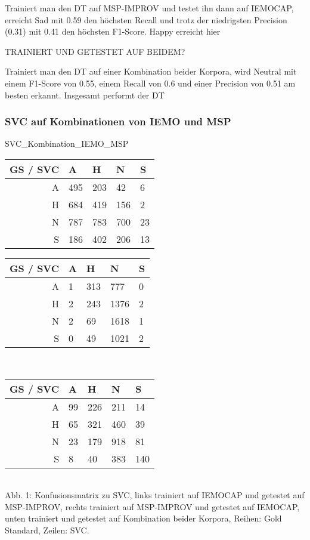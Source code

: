 \documentclass{article} %
\begin{document}
Trainiert man den DT auf MSP-IMPROV und testet ihn dann auf IEMOCAP, erreicht Sad mit 0.59 den höchsten Recall und trotz der niedrigsten Precision (0.31) mit 0.41 den höchsten F1-Score. 
Happy erreicht hier 

TRAINIERT UND GETESTET AUF BEIDEM?

Trainiert man den DT auf einer Kombination beider Korpora, wird Neutral mit einem F1-Score von 0.55, einem Recall von 0.6 und einer Precision von 0.51 am besten erkannt. Insgesamt performt der DT 

\subsubsection{SVC auf Kombinationen von IEMO und MSP}

SVC_Kombination_IEMO_MSP \\
\begin{tabular}{|r|llll|}
\hline
GS / SVC & A & H & N & S \\
\hline
A & 495 & 203 & 42 & 6 \\
H & 684 & 419 & 156 & 2 \\
N & 787 & 783 & 700 & 23 \\
S & 186 & 402 & 206 & 13 \\
\hline
\end{tabular}
\begin{tabular}{|r|llll|}
\hline
GS / SVC & A & H & N & S \\
\hline
A & 1 & 313 & 777 & 0 \\
H & 2 & 243 & 1376 & 2 \\
N & 2 & 69 & 1618 & 1 \\
S & 0 & 49 & 1021 & 2 \\
\hline
\end{tabular} \\
\begin{tabular}{|r|llll|}
\hline
GS / SVC & A & H & N & S \\
\hline
A & 99 & 226 & 211 & 14 \\
H & 65 & 321 & 460 & 39 \\
N & 23 & 179 & 918 & 81 \\
S & 8 & 40 & 383 & 140 \\
\hline
\end{tabular} \\

Abb. 1: Konfusionsmatrix zu SVC, links trainiert auf IEMOCAP und getestet auf MSP-IMPROV, rechts trainiert auf MSP-IMPROV und getestet auf IEMOCAP, unten trainiert und getestet auf Kombination beider Korpora, Reihen: Gold Standard, Zeilen: SVC. \\
\end{document}
